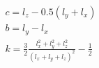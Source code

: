 


\begin{eqnarray*}
 c = l_z - 0.5(l_y+l_x) \\
 b = l_y - l_x \\
 k = \frac{3}{2} \frac{l_x^2+l_y^2+l_z^2}{(l_x+l_y+l_z)^2} - \frac{1}{2} 
\end{eqnarray*}



